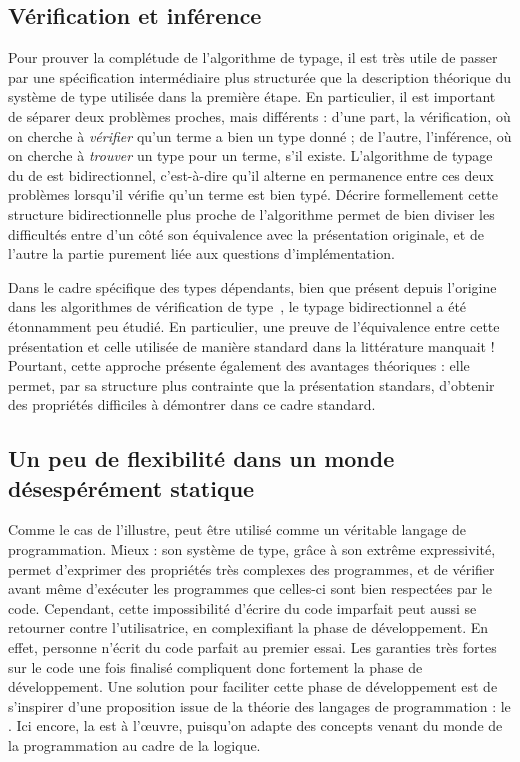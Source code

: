 \subsection{Vérification et inférence}

Pour prouver la complétude de l’algorithme de typage, il est très utile de
passer par une spécification intermédiaire plus structurée que la description
théorique du système de type utilisée dans la première étape.
En particulier, il est important de séparer deux problèmes proches, mais
différents :
d'une part, la vérification, où on cherche à \emph{vérifier}
qu’un terme a bien un type
donné ; de l’autre, l’inférence, où on cherche à \emph{trouver}
un type pour un terme, s'il existe.
L’algorithme de typage du  de  est bidirectionnel,
c'est-à-dire qu’il alterne en permanence entre ces deux problèmes
lorsqu’il vérifie qu’un terme est bien typé.
Décrire formellement cette structure bidirectionnelle plus proche de l’algorithme
permet de bien diviser les difficultés entre d’un côté
son équivalence avec la présentation
originale, et de l’autre la partie purement liée aux questions d’implémentation.

Dans le cadre spécifique des types dépendants, bien que présent depuis l’origine dans les algorithmes de vérification de type~,
le typage bidirectionnel a été étonnamment peu étudié. En particulier, une preuve
de l’équivalence entre cette présentation et celle utilisée de manière standard
dans la littérature manquait !
Pourtant, cette approche présente également
des avantages théoriques : elle permet,
par sa structure plus contrainte que la présentation standars,
d’obtenir des propriétés difficiles à démontrer dans ce cadre standard.

\subsection{Un peu de flexibilité dans un monde désespérément statique}
\label{sec:intro-graduel}

Comme le cas de  l’illustre,  peut être utilisé comme un véritable langage
de programmation. Mieux : son système de type, grâce à son extrême expressivité, 
permet d’exprimer des propriétés très complexes des programmes, et de vérifier
avant même d’exécuter les programmes que celles-ci sont bien respectées par le code.
Cependant, cette impossibilité d’écrire du code imparfait peut aussi se retourner contre l’utilisatrice, en complexifiant la phase de développement.
En effet, personne n’écrit du code parfait au premier essai. Les garanties très
fortes sur le code une fois finalisé compliquent donc 
fortement la phase de développement.
Une solution pour faciliter cette phase de développement
est de s’inspirer d’une proposition issue de la théorie des langages de
programmation : le . Ici encore, la 
est à l’œuvre, puisqu’on adapte des concepts venant du monde de la programmation
au cadre de la logique.

